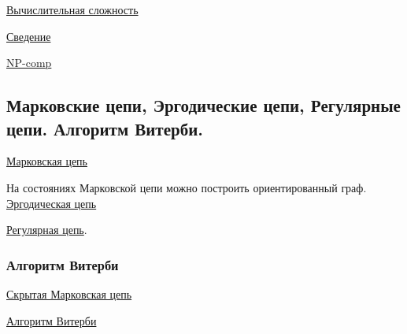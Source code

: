 \documentclass{article}
\begin{document}
\href{
	http://www.machinelearning.ru/wiki/index.php?title=%
}{Вычислительная сложность}

\href{https://ru.wikipedia.org/wiki/%D0%A1%D0%B2%D0%B5%D0%B4%D0%B5%D0%BD%D0%B8%D0%B5_(%D1%82%D0%B5%D0%BE%D1%80%D0%B8%D1%8F_%D1%81%D0%BB%D0%BE%D0%B6%D0%BD%D0%BE%D1%81%D1%82%D0%B8_%D0%B2%D1%8B%D1%87%D0%B8%D1%81%D0%BB%D0%B5%D0%BD%D0%B8%D0%B9)}{Сведение}

\href{
	https://ru.wikipedia.org/wiki/NP-%
}{NP-comp}


\subsection{Марковские цепи, Эргодические цепи, Регулярные цепи. Алгоритм Витерби.}

\href{https://neerc.ifmo.ru/wiki/index.php?title=%D0%9C%D0%B0%D1%80%D0%BA%D0%BE%D0%B2%D1%81%D0%BA%D0%B0%D1%8F_%D1%86%D0%B5%D0%BF%D1%8C}{Марковская цепь}

На состояниях Марковской цепи можно построить ориентированный граф.
\href{https://neerc.ifmo.ru/wiki/index.php?title=%D0%AD%D1%80%D0%B3%D0%BE%D0%B4%D0%B8%D1%87%D0%B5%D1%81%D0%BA%D0%B0%D1%8F_%D0%BC%D0%B0%D1%80%D0%BA%D0%BE%D0%B2%D1%81%D0%BA%D0%B0%D1%8F_%D1%86%D0%B5%D0%BF%D1%8C}{Эргодическая цепь}

\href{https://neerc.ifmo.ru/wiki/index.php?title=%D0%A0%D0%B5%D0%B3%D1%83%D0%BB%D1%8F%D1%80%D0%BD%D0%B0%D1%8F_%D0%BC%D0%B0%D1%80%D0%BA%D0%BE%D0%B2%D1%81%D0%BA%D0%B0%D1%8F_%D1%86%D0%B5%D0%BF%D1%8C}{Регулярная цепь}.

\subsubsection{Алгоритм Витерби}
\href{https://neerc.ifmo.ru/wiki/index.php?title=%D0%A1%D0%BA%D1%80%D1%8B%D1%82%D1%8B%D0%B5_%D0%9C%D0%B0%D1%80%D0%BA%D0%BE%D0%B2%D1%81%D0%BA%D0%B8%D0%B5_%D0%BC%D0%BE%D0%B4%D0%B5%D0%BB%D0%B8}{Скрытая Марковская цепь}

\href{https://neerc.ifmo.ru/wiki/index.php?title=%D0%90%D0%BB%D0%B3%D0%BE%D1%80%D0%B8%D1%82%D0%BC_%D0%92%D0%B8%D1%82%D0%B5%D1%80%D0%B1%D0%B8}{Алгоритм Витерби}
\end{document}
